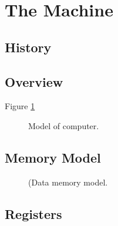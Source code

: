 \section{The Machine}
\label{sec:machine}

\subsection{History}







\subsection{Overview}

Figure \ref{fig:machine:computer}

\begin{figure}[tbp]
  
  \caption{Model of computer.}
  \label{fig:machine:computer}
\end{figure}

\subsection{Memory Model}

\begin{figure}[tbp]
  
  \caption{(Data memory model.}
  \label{fig:machine:memory}
\end{figure}

\subsection{Registers}




